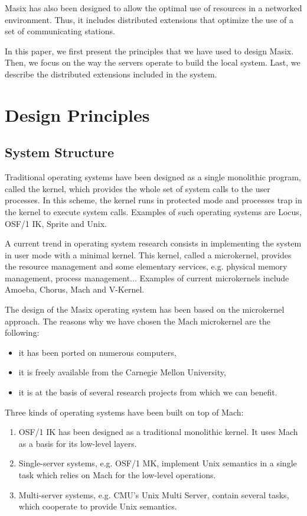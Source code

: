 	Masix has also been designed to allow the optimal use of resources
in a networked environment. Thus, it includes distributed extensions that
optimize the use of a set of communicating stations.

	In this paper, we first present the principles that we have used to
design Masix. Then, we focus on the way the servers operate to build
the local system. Last, we describe the distributed extensions included in
the system.

\section {Design Principles}

\subsection {System Structure}

	Traditional operating systems have been designed as a single
monolithic program, called the kernel, which provides the whole set of
system calls to the user processes. In this scheme, the kernel runs in
protected mode and processes trap in the kernel to execute system calls.
Examples of such operating systems are Locus\cite {popek:walker:locus},
OSF/1 IK\cite {osf1}, Sprite\cite {ousterhout:sprite} and
Unix\cite {bach,leffler:bsd}.

	A current trend in operating system research consists in implementing
the system in user mode with a minimal kernel. This kernel, called a
microkernel, provides the resource management and some elementary services,
e.g. physical memory management, process management... Examples of current
microkernels include Amoeba\cite {mullender:amoeba},
Chorus\cite {rozier:chorus:overview}, Mach\cite {mach:foundation} and
V-Kernel\cite {cheriton:v}.

	The design of the Masix operating system\cite {card:these} has been
based on the microkernel approach. The reasons why we have chosen the
Mach microkernel are the following:
\begin {itemize}
\item it has been ported on numerous computers,
\item it is freely available from the Carnegie Mellon University,
\item it is at the basis of several research projects from which we can
benefit.
\end {itemize}

	Three kinds of operating systems have been built on top of Mach:
\begin {enumerate}
\item OSF/1 IK\cite {osf1} has been designed as a traditional monolithic
kernel. It uses Mach as a basis for its low-level layers.
\item Single-server systems, e.g. OSF/1 MK\cite {osf1mk}, implement Unix
semantics in a single task which relies on Mach for the low-level operations.
\item Multi-server systems, e.g. CMU's Unix Multi
Server\cite {mach:multiserv1}, contain several tasks, which cooperate to
provide Unix semantics.
\end {enumerate}

